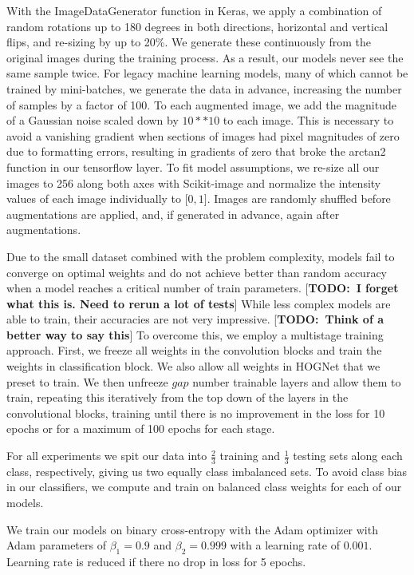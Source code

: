 \documentclass{article}
\newcommand{\todo}[1]{ {\color{red}[{\bf TODO:~{#1}}]}}
\begin{document}
With the ImageDataGenerator function in Keras, we apply a combination of random rotations up to 180 degrees in both directions, horizontal and vertical flips, and re-sizing by up to 20\%. We generate these continuously from the original images during the training process. As a result, our models never see the same sample twice. For legacy machine learning models, many of which cannot be trained by mini-batches, we generate the data in advance, increasing the number of samples by a factor of 100.  To each augmented image, we add the magnitude of a Gaussian noise scaled down by \(10**10\)  to each image. This is necessary to avoid a vanishing gradient when sections of images had pixel magnitudes of zero due to formatting errors, resulting in gradients of zero that broke the arctan2 function in our tensorflow layer. To fit model assumptions, we re-size all our images to 256 along both axes with Scikit-image and normalize the intensity values of each image individually to \(\big[0, 1\big]\).  Images are randomly shuffled before augmentations are applied, and, if generated in advance, again after augmentations. 

Due to the small dataset combined with the problem complexity, models fail to converge on optimal weights and do not achieve better than random accuracy when a model reaches a critical number of train parameters. \todo{I forget what this is. Need to rerun a lot of tests} While less complex models are able to train, their accuracies are not very impressive. \todo{Think of a better way to say this} To overcome this, we employ a multistage training approach. First, we freeze all weights in the convolution blocks and train the weights in classification block. We also allow all weights in HOGNet that we preset to train. We then unfreeze \( gap\) number trainable layers and allow them to train, repeating this iteratively from the top down of the layers in the convolutional blocks, training until there is no improvement in the loss for 10 epochs or for a maximum of 100 epochs for each stage. 

For all experiments we spit our data into \(\frac{2}{3}\) training and \(\frac{1}{3}\) testing sets along each class, respectively, giving us two equally class imbalanced sets. To avoid class bias in our classifiers, we compute and train on balanced class weights for each of our models. 

We train our models on binary cross-entropy with the Adam optimizer with Adam parameters of \(\beta_1 = 0.9\) and \(\beta_2 = 0.999\) with a learning rate of \(0.001\). Learning rate is reduced if there no drop in loss for 5 epochs.
\end{document}
